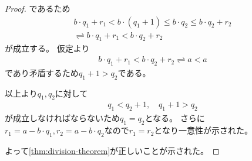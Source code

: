 \documentclass[uplatex, 11pt, a4j, dvipdfmx]{jsarticle}
\begin{document}
\begin{proof}
    であるため
    \begin{equation} \begin{aligned}
      b \cdot q_1 + r_1 < b \cdot (q_1 + 1) \leq b \cdot q_2 \leq b \cdot q_2 + r_2 \\
      \rightleftharpoons b \cdot q_1 + r_1 <  b \cdot q_2 + r_2
    \end{aligned} \end{equation}
    が成立する。
    仮定より
    \begin{equation} \begin{aligned}
      b \cdot q_1 + r_1 < b \cdot q_2 + r_2 \rightleftharpoons a < a
    \end{aligned} \end{equation}
    であり矛盾するため$q_1 + 1 > q_2$である。

    以上より$q_1, q_2$に対して
    \begin{equation}\begin{gathered}
      q_1 < q_2 + 1, \quad q_1 + 1 > q_2
    \end{gathered}\end{equation}
    が成立しなければならないため$q_1 = q_2$となる。
    さらに$r_1 = a - b \cdot q_1, r_2 = a - b \cdot q_2$なので$r_1 = r_2$となり一意性が示された。

    よって\cref{thm:division-theorem}が正しいことが示された。
  \end{proof}

\end{document}
